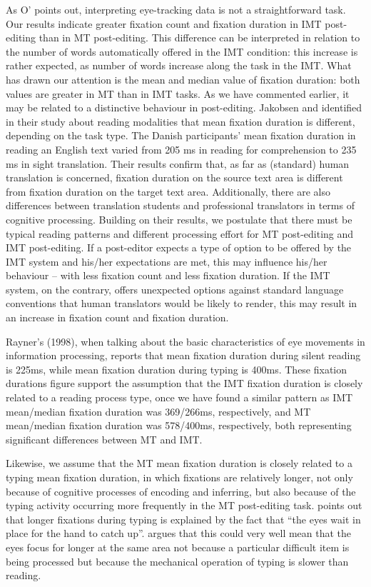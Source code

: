 \documentclass[output=paper]{langsci/langscibook}
\begin{document}
As O’\citet{Brien2008} points out, interpreting eye-tracking data is not a straightforward task. Our results indicate greater fixation count and fixation duration in IMT post-editing than in MT post-editing. This difference can be interpreted in relation to the number of words automatically offered in the IMT condition: this increase is rather expected, as number of words increase along the task in the IMT. What has drawn our attention is the mean and median value of fixation duration: both values are greater in MT than in IMT tasks. As we have commented earlier, it may be related to a distinctive behaviour in post-editing. Jakobsen and \citet{Jensen2008} identified in their study about reading modalities that mean fixation duration is different, depending on the task type. The Danish participants’ mean fixation duration in reading an English text varied from 205 ms in reading for comprehension to 235 ms in sight translation. Their results confirm that, as far as (standard) human translation is concerned, fixation duration on the source text area is different from fixation duration on the target text area. Additionally, there are also differences between translation students and professional translators in terms of cognitive processing. Building on their results, we postulate that there must be typical reading patterns and different processing effort for MT post-editing and IMT post-editing. If a post-editor expects a type of option to be offered by the IMT system and his/her expectations are met, this may influence his/her behaviour – with less fixation count and less fixation duration. If the IMT system, on the contrary, offers unexpected options against standard language conventions that human translators would be likely to render, this may result in an increase in fixation count and fixation duration.


Rayner’s (1998), when talking about the basic characteristics of eye movements in information processing, reports that mean fixation duration during silent reading is 225ms, while mean fixation duration during typing is 400ms. These fixation durations figure support the assumption that the IMT fixation duration is closely related to a reading process type, once we have found a similar pattern as IMT mean/median fixation duration was 369/266ms, respectively, and MT mean/median fixation duration was 578/400ms, respectively, both representing significant differences between MT and IMT.



Likewise, we assume that the MT mean fixation duration is closely related to a typing mean fixation duration, in which fixations are relatively longer, not only because of cognitive processes of encoding and inferring, but also because of the typing activity occurring more frequently in the MT post-editing task. \citet[396]{Rayner1998} points out that longer fixations during typing is explained by the fact that “the eyes wait in place for the hand to catch up”. \citet{Hvelplund2015} argues that this could very well mean that the eyes focus for longer at the same area not because a particular difficult item is being processed but because the mechanical operation of typing is slower than reading.  
\end{document}
